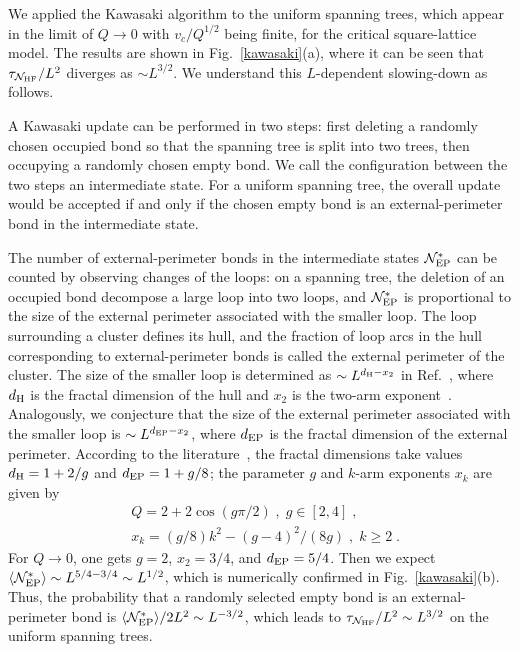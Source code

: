 \documentclass[aps,pre,twocolumn,superscriptaddress,longbibliography,floatfix]{revtex4-2}
\begin{document}
We applied the Kawasaki algorithm to the uniform spanning trees,
which appear in the limit of $Q \rightarrow 0$ with $v_c/Q^{1/2}$ being finite, for the critical square-lattice model.
The results are shown in Fig.~\ref{kawasaki}(a), where it can be seen that $\tau_{\mathcal{N}_{\rm HF}}/L^2$ diverges as $\sim L^{3/2}$. 
We understand this $L$-dependent slowing-down as follows.

A Kawasaki update can be performed in two steps: first deleting a randomly chosen occupied bond so that the spanning tree is split into two trees, then occupying a randomly chosen empty bond.
We call the configuration between the two steps an intermediate state. For a uniform spanning tree, the overall update would be accepted if and only if the chosen empty bond is an external-perimeter bond in the intermediate state.

The number of external-perimeter bonds in the intermediate states $\mathcal{N}^*_{\rm EP}$ can be counted by observing changes of the loops: on a spanning tree, the deletion of an occupied bond decompose a large loop into two loops, and $\mathcal{N}^*_{\rm EP}$ is proportional to the size of the external perimeter associated with the smaller loop.
The loop surrounding a cluster defines its hull, and the fraction of loop arcs in the hull corresponding to external-perimeter bonds is called the external perimeter of the cluster.
The size of the smaller loop is determined as $\sim L^{d_{\rm H} - x_2}$ in Ref.~\cite{deng2010some}, where $d_{\rm H}$ is the fractal dimension of the hull and $x_2$ is the two-arm exponent~\cite{saleur1987exact}.
Analogously, we conjecture that the size of the external perimeter associated with the smaller loop is $\sim L^{d_{\rm EP} - x_2}$, where $d_{\rm EP}$ is the fractal dimension of the external perimeter.
According to the literature~\cite{saleur1987exact,nienhuis1984critical,cardy1998number,deng2010some}, the fractal dimensions take values $d_{\rm H}=1+2/g$ and $d_{\rm EP}=1+g/8$; the parameter $g$ and $k$-arm exponents $x_k$ are given by 
\begin{align}
   &Q=2+2\cos(g \pi /2) \;, \; g \in [2,4] \;,\\
   &x_k=(g/8)k^2-(g-4)^2/(8g) \;, \; k \geq 2 \;.
\end{align}
For $Q \rightarrow 0$,  one gets $g=2$, $x_2=3/4$, and $d_{\rm EP}=5/4$. Then we expect  $\langle \mathcal{N}^*_{\rm EP} \rangle \sim L^{5/4-3/4} \sim L^{1/2}$, which is numerically confirmed in Fig.~\ref{kawasaki}(b). 
Thus, the probability that a randomly selected empty bond is an external-perimeter bond is $\langle \mathcal{N}^*_{\rm EP} \rangle /2L^2 \sim L^{-3/2}$,
which leads to $\tau_{\mathcal{N}_{\rm HF}}/L^2 \sim L^{3/2}$ on the uniform spanning trees.
\end{document}
